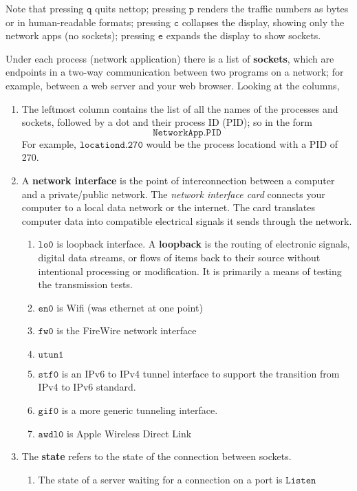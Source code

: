 \documentclass[a4paper, 12pt]{report}
\theoremstyle{remark}
\theoremstyle{definition}
\begin{document}
Note that pressing $\texttt{q}$ quits nettop; pressing $\texttt{p}$ renders the traffic numbers as bytes or in human-readable formats; pressing $\texttt{c}$ collapses the display, showing only the network apps (no sockets); pressing $\texttt{e}$ expands the display to show sockets. 

Under each process (network application) there is a list of \textbf{sockets}, which are endpoints in a two-way communication between two programs on a network; for example, between a web server and your web browser. Looking at the columns, 
\begin{enumerate}
    \item The leftmost column contains the list of all the names of the processes and sockets, followed by a dot and their process ID (PID); so in the form
    \[\texttt{NetworkApp.PID}\]
    For example, $\texttt{locationd.270}$ would be the process locationd with a PID of 270. 
    \item A \textbf{network interface} is the point of interconnection between a computer and a private/public network. The \textit{network interface card} connects your computer to a local data network or the internet. The card translates computer data into compatible electrical signals it sends through the network. 
    \begin{enumerate}
        \item $\texttt{lo0}$ is loopback interface. A \textbf{loopback} is the routing of electronic signals, digital data streams, or flows of items back to their source without intentional processing or modification. It is primarily a means of testing the transmission tests. 
        \item $\texttt{en0}$ is Wifi (was ethernet at one point)
        \item $\texttt{fw0}$ is the FireWire network interface 
        \item $\texttt{utun1}$
        \item $\texttt{stf0}$ is an IPv6 to IPv4 tunnel interface to support the transition from IPv4 to IPv6 standard. 
        \item $\texttt{gif0}$ is a more generic tunneling interface. 
        \item $\texttt{awdl0}$ is Apple Wireless Direct Link
    \end{enumerate}
    \item The \textbf{state} refers to the state of the connection between sockets. 
    \begin{enumerate}
        \item The state of a server waiting for a connection on a port is $\texttt{Listen}$

\end{enumerate}
\end{enumerate}
\end{document}

